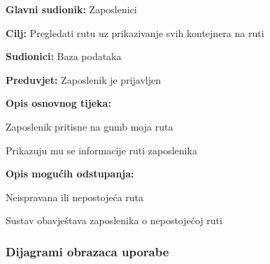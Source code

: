 			\noindent {}
			\begin{packed_item}
				
				\item \textbf{Glavni sudionik:} Zaposlenici
				\item  \textbf{Cilj:} Pregledati rutu uz prikazivanje svih kontejnera na ruti
				\item  \textbf{Sudionici:} Baza podataka
				\item  \textbf{Preduvjet:} Zaposlenik je prijavljen
				\item  \textbf{Opis osnovnog tijeka:}
				
				\item[] \begin{packed_enum}
					
					\item Zaposlenik pritisne na gumb moja ruta
					\item Prikazuju mu se informacije ruti zaposlenika
					
				\end{packed_enum}
				
				\item  \textbf{Opis mogućih odstupanja:}
				
				\item[] \begin{packed_item}
					
					\item[2.a] Neispravana ili nepostojeća ruta
					\item[] \begin{packed_enum}
						
						\item Sustav obavještava zaposlenika o nepostojećoj ruti

					\end{packed_enum}
					
				\end{packed_item}
			\end{packed_item}
			
			\subsubsection{Dijagrami obrazaca uporabe}
			
